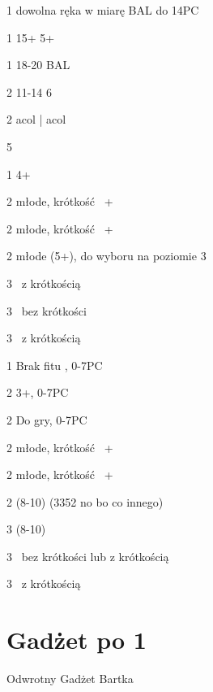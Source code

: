 \documentclass[12pt, a4paper]{report}
\begin{document}
\sequence{{1\clubs}{1\diams}}
\begin{options}[1]
    \item[1\hearts] dowolna ręka w miarę BAL do 14PC \vimp
    \item[1\spades] 15+ 5+\clubs \vimp
    \item[1\nt] 18-20 BAL
    \item[2\clubs] 11-14 6\clubs  
    \item[2\diams] acol \clubs | acol \clubs\diams \imp
\end{options}

\sequence{{1\clubs}{1\diams}{1\hearts}}
\begin{options}[2]
    \item[\pass] 5\hearts
    \item[1\spades] 4+\spades 
    \item[2\hearts] młode, krótkość \hearts\ \inv+
    \item[2\spades] młode, krótkość \spades\ \inv+
    \item[2\nt] młode (5+\clubs), do wyboru na poziomie 3
    \item[3\clubs] \gf\ \diams z krótkością \clubs
    \item[3\diams] \gf\ \diams bez krótkości
    \item[3\major] \gf\ \diams z krótkością   
\end{options}

\sequence{{1\clubs}{1\diams}{1\spades}}
\begin{options}[2]
    \item[1\nt] Brak fitu \clubs, 0-7PC
    \item[2\clubs] 3+\clubs, 0-7PC
    \item[2\diams] Do gry, 0-7PC
    \item[2\hearts] młode, krótkość \hearts\ \inv+
    \item[2\spades] młode, krótkość \spades\ \inv+
    \item[2\nt] \inv (8-10) (3352 no bo co innego)
    \item[3\clubs] \inv (8-10)  
    \item[3\diams] \gf\ \diams bez krótkości lub z krótkością \clubs
    \item[3\major] \gf\ \diams z krótkością 
\end{options}

\section{Gadżet po 1\clubs}
Odwrotny Gadżet Bartka
\end{document}
